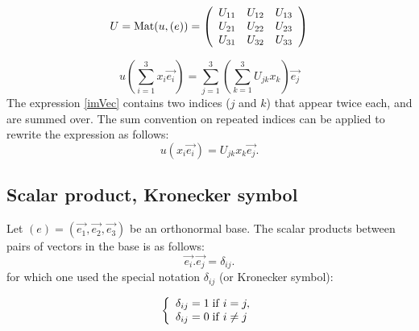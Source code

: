\documentclass[DIV=12]{article}
\begin{document}
\[
U= {\mathrm{Mat}}(u, (e))=  \left(
   \begin{array}{l l l}
      U_{11}  & U_{12} & U_{13} \\
      U_{21}   & U_{22} & U_{23}\\
      U_{31} & U_{32} & U_{33}
   \end{array}
   \right)
\]

\begin{equation}
u\left( \sum_{i=1}^3 x_i \vec{e_i}\right) = \sum_{j=1}^3\left(\sum_{k=1}^3 U_{jk} x_k\right) \vec{e_j}
\label{imVec}
\end{equation}
The expression \ref{imVec} contains two indices ($j$ and $k$) that appear 
twice each, and are summed over. The sum convention on repeated indices 
 can be applied to rewrite the expression as follows:
\begin{equation}
u( x_i \vec{e_i}) =  U_{jk} x_k \vec{e_j}.
\label{imVecContracted}
\end{equation}







\subsection{Scalar product, Kronecker symbol}
 Let $(e)=(\vec{e_1},\vec{e_2},\vec{e_3})$ be an orthonormal base. The scalar 
 products between pairs of vectors in the base is as follows:
\begin{equation}
 \vec{e_i}.\vec{e_j} = \delta_{ij}.
\end{equation}
 for which one used the special notation $\delta_{ij}$ (or Kronecker symbol):

\[
\left\{
   \begin{array}{l l}
      \delta_{ij} = 1\;\mathrm{if}\; i=j,\\
      \delta_{ij} = 0\;\mathrm{if}\;i\neq j
   \end{array}
 \right.
\]
\end{document}
